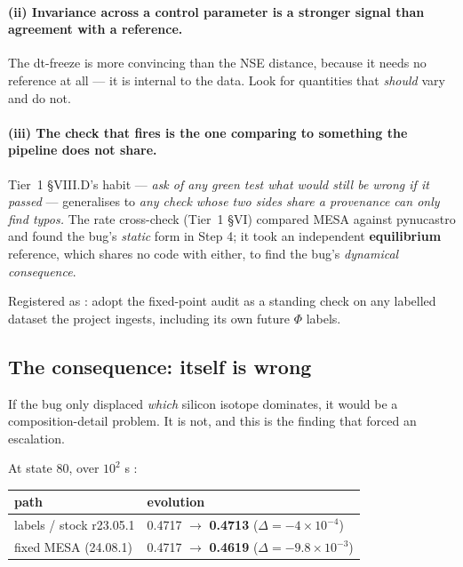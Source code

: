 \paragraph{(ii) Invariance across a control parameter is a stronger signal than
agreement with a reference.} The dt-freeze is more convincing than the NSE
distance, because it needs no reference at all --- it is internal to the data.
Look for quantities that \emph{should} vary and do not.

\paragraph{(iii) The check that fires is the one comparing to something the
pipeline does not share.} Tier~1 \S VIII.D's habit --- \emph{ask of any green
test what would still be wrong if it passed} --- generalises to \emph{any check
whose two sides share a provenance can only find typos.} The rate cross-check
(Tier~1 \S VI) compared MESA against pynucastro and found the bug's
\emph{static} form in Step 4; it took an independent \textbf{equilibrium}
reference, which shares no code with either, to find the bug's \emph{dynamical
consequence}.

Registered as : adopt the fixed-point audit as a standing check on
any labelled dataset the project ingests, including its own future $\Phi$
labels.

\subsection{The consequence: \texorpdfstring{\Ye}{Ye} itself is wrong}
\label{sec:yewrong}

If the bug only displaced \emph{which} silicon isotope dominates, it would be a
composition-detail problem. It is not, and this is the finding that forced an
escalation.

At state 80, over $10^{2}$ s :

\begin{tabularx}{\textwidth}{@{}L{5.0cm} Y@{}}
\toprule
\textbf{path} & \textbf{\Ye{} evolution} \\
\midrule
labels / stock r23.05.1 & 0.4717 $\to$ \textbf{0.4713}
  ($\Delta = -4 \times 10^{-4}$) \\
fixed MESA (24.08.1) & 0.4717 $\to$ \textbf{0.4619}
  ($\Delta = -9.8 \times 10^{-3}$) \\
\bottomrule
\end{tabularx}

